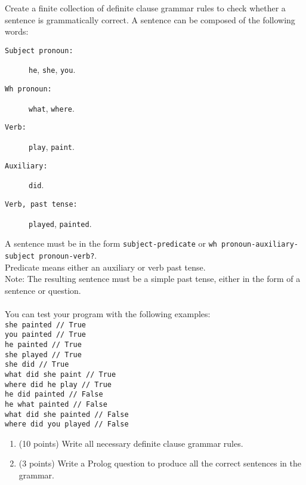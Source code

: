 \noindent
Create a finite collection of definite clause grammar rules to check whether a sentence is grammatically
correct. A sentence can be composed of the following words:
%
\begin{description}
	\item [\texttt{Subject pronoun:}] \texttt{he}, \texttt{she}, \texttt{you}.
	\item [\texttt{Wh pronoun:}] \texttt{what}, \texttt{where}.
	\item [\texttt{Verb:}] \texttt{play}, \texttt{paint}.
	\item [\texttt{Auxiliary:}] \texttt{did}.
    \item [\texttt{Verb, past tense:}] \texttt{played}, \texttt{painted}.

\end{description}
%
A sentence must be in the form \texttt{subject-predicate} or \texttt{wh pronoun-auxiliary-subject pronoun-verb?}.
%
\\
Predicate means either an auxiliary or verb past tense.
\\
%
Note: The resulting sentence must be a simple past tense, either in the form of a sentence or question.
\\ \\
You can test your program with the following examples: \\
\texttt{she painted // True} \\
\texttt{you painted // True} \\
\texttt{he painted // True} \\
\texttt{she played // True} \\
\texttt{she did // True } \\
\texttt{what did she paint // True} \\
\texttt{where did he play // True} \\
\texttt{he did painted // False} \\
\texttt{he what painted // False} \\
\texttt{what did she painted // False} \\
\texttt{where did you played // False} \\

\newpage
\begin{enumerate}
    \item (10 points) Write all necessary definite clause grammar rules.
    
    \vspace{14cm}
    
    \item (3 points) Write a Prolog question to produce all the correct sentences in the grammar.
\end{enumerate}




